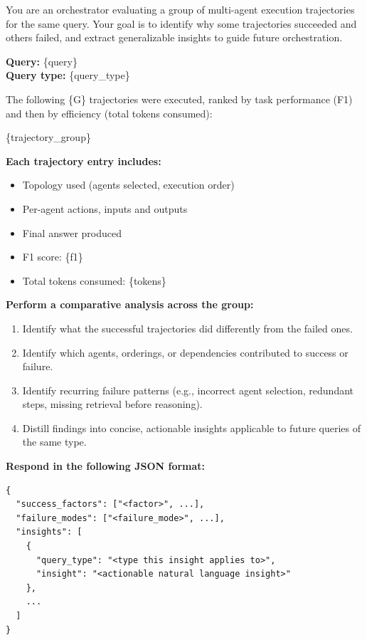 \begin{tcolorbox}[colback=promptbg!100!white,title=Orchestrator: Semantic Advantage Extraction]
\small
You are an orchestrator evaluating a group of multi-agent execution trajectories
for the same query. Your goal is to identify why some trajectories succeeded and 
others failed, and extract generalizable insights to guide future orchestration.

\vspace{0.5em}
\textbf{Query:} \{query\} \\
\textbf{Query type:} \{query\_type\}

\vspace{0.5em}
The following \{G\} trajectories were executed, ranked by task performance (F1) 
and then by efficiency (total tokens consumed):

\vspace{0.5em}
\{trajectory\_group\}

\vspace{0.5em}
\textbf{Each trajectory entry includes:}
\begin{itemize}
    \item Topology used (agents selected, execution order)
    \item Per-agent actions, inputs and outputs
    \item Final answer produced
    \item F1 score: \{f1\}
    \item Total tokens consumed: \{tokens\}
\end{itemize}

\vspace{0.5em}
\textbf{Perform a comparative analysis across the group:}
\begin{enumerate}
    \item Identify what the successful trajectories did differently from the failed ones.
    \item Identify which agents, orderings, or dependencies contributed to success or failure.
    \item Identify recurring failure patterns (e.g., incorrect agent selection, redundant steps, missing retrieval before reasoning).
    \item Distill findings into concise, actionable insights applicable to future queries of the same type.
\end{enumerate}

\vspace{0.5em}
\textbf{Respond in the following JSON format:}
\begin{verbatim}
{
  "success_factors": ["<factor>", ...],
  "failure_modes": ["<failure_mode>", ...],
  "insights": [
    {
      "query_type": "<type this insight applies to>",
      "insight": "<actionable natural language insight>"
    },
    ...
  ]
}
\end{verbatim}
\end{tcolorbox}





